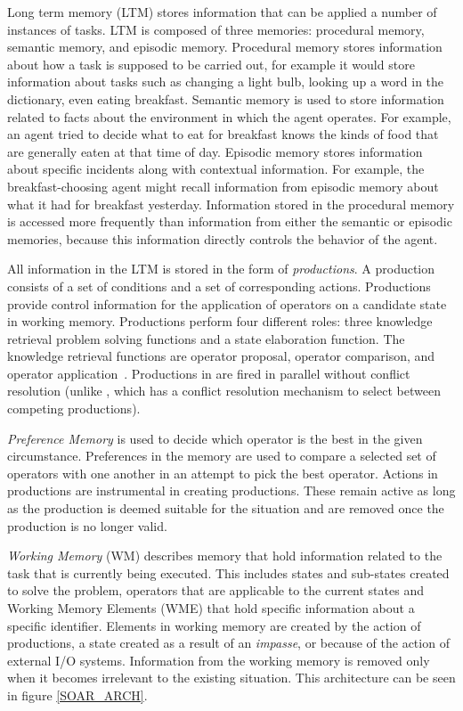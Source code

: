 Long term memory (LTM) stores information that can be applied a number
of instances of tasks. LTM is composed of three memories: procedural
memory, semantic memory, and episodic memory. Procedural memory stores
information about how a task is supposed to be carried out, for
example it would store information about tasks such as changing a
light bulb, looking up a word in the dictionary, even eating
breakfast.  Semantic memory is used to store information related to
facts about the environment in which the agent operates.  For example,
an agent tried to decide what to eat for breakfast knows the kinds of
food that are generally eaten at that time of day.  Episodic memory
stores information about specific incidents along with contextual
information.  For example, the breakfast-choosing agent might recall
information from episodic memory about what it had for breakfast
yesterday.  Information stored in the procedural memory is accessed
more frequently than information from either the semantic or episodic
memories, because this information directly controls the behavior of
the agent.

All information in the LTM is stored in the form of
\emph{productions}. A production consists of a set of conditions and a
set of corresponding actions. Productions provide control information
for the application of operators on a candidate state in  working
memory. Productions perform four different roles: three knowledge
retrieval problem solving functions and a state elaboration
function. The knowledge retrieval functions are operator proposal,
operator comparison, and operator
application~\cite{Laird:2006aa}. Productions in \soar are fired in
parallel without conflict resolution (unlike \actr, which has a
conflict resolution mechanism to select between competing
productions).

\emph{Preference Memory} is used to decide which operator is the best in the
given circumstance.  Preferences in the memory are used to compare a
selected set of operators with one another in an attempt to pick 
the best operator. Actions in productions are instrumental in creating
productions. These remain active as long as the production is deemed
suitable for the situation and are removed once the production is no longer
valid.

\emph{Working Memory} (WM) describes memory that hold information
related to the task that is currently being executed. This includes
states and sub-states created to solve the problem, operators that are
applicable to the current states and Working Memory Elements (WME)
that hold specific information about a specific identifier. Elements
in working memory are created by the action of productions, a state
created as a result of an \emph{impasse}, or because of the action of
external I/O systems. Information from the working memory is removed
only when it becomes irrelevant to the existing situation. This
architecture can be seen in figure \ref{SOAR_ARCH}.

